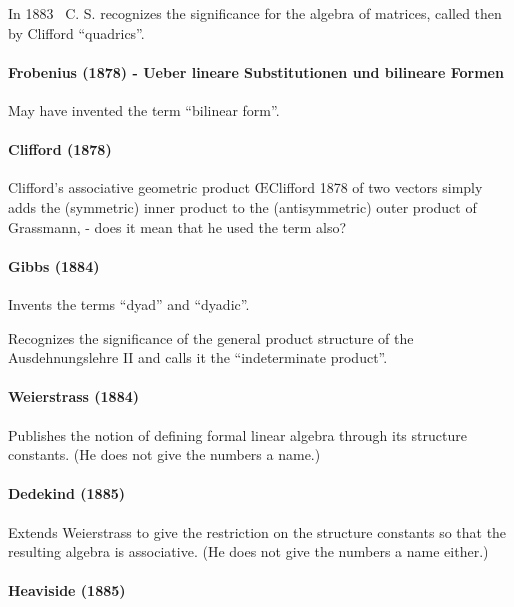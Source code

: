 In 1883~\cite{Peirce1883} C. S. recognizes the significance for the algebra of matrices, called then by Clifford ``quadrics''.

\paragraph{Frobenius (1878) - Ueber lineare Substitutionen und bilineare Formen}

May have invented the term ``bilinear form''.



\paragraph{Clifford (1878)~\cite{Clifford1878}}

Clifford’s associative geometric product ŒClifford 1878 of two vectors simply adds the
(symmetric) inner product to the (antisymmetric) outer product of Grassmann, - does it mean that he used the term also?


\paragraph{Gibbs (1884)}

Invents the terms ``dyad'' and ``dyadic''.

Recognizes the significance of the general product structure of the Ausdehnungslehre II and calls it the ``indeterminate product''.




\paragraph{Weierstrass (1884)~\cite{Weierstrass1884}}

Publishes the notion of defining formal linear algebra through its structure constants. (He does not give the numbers a name.)

\paragraph{Dedekind (1885)~\cite{Dedekind1885}}

Extends Weierstrass to give the restriction on the structure constants so that the resulting algebra is associative. (He does not give the numbers a name either.)


\paragraph{Heaviside (1885)}

